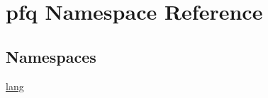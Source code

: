 \hypertarget{namespacepfq}{}\section{pfq Namespace Reference}
\label{namespacepfq}
\subsection*{Namespaces}
\begin{DoxyCompactItemize}
\item 
 \hyperlink{namespacepfq_1_1lang}{lang}
\end{DoxyCompactItemize}
